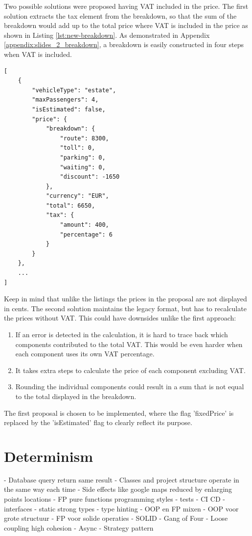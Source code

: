 Two possible solutions were proposed having VAT included in the price. The first solution extracts the tax element from the breakdown, so that the sum of the breakdown would add up to the total price where VAT is included in the price as shown in Listing \ref{lst:new-breakdown}. As demonstrated in Appendix \ref{appendix:slides_2_breakdown}, a breakdown is easily constructed in four steps when VAT is included.

\begin{lstlisting}[caption={Improved price breakdown}, label={lst:new-breakdown}]
[
	{
		"vehicleType": "estate",
		"maxPassengers": 4,
		"isEstimated": false,
		"price": {
			"breakdown": {
				"route": 8300,
				"toll": 0,
				"parking": 0,
				"waiting": 0,
				"discount": -1650
			},
			"currency": "EUR",
			"total": 6650,
			"tax": {
				"amount": 400,
				"percentage": 6
			}
		}
	},
	...
]
\end{lstlisting}

Keep in mind that unlike the listings the prices in the proposal are not displayed in cents. The second solution maintains the legacy format, but has to recalculate the prices without VAT. This could have downsides unlike the first approach:

\begin{enumerate}
	\item If an error is detected in the calculation, it is hard to trace back which components contributed to the total VAT. This would be even harder when each component uses its own VAT percentage.
	\item It takes extra steps to calculate the price of each component excluding VAT.
	\item Rounding the individual components could result in a sum that is not equal to the total displayed in the breakdown.
\end{enumerate}

The first proposal is chosen to be implemented, where the flag 'fixedPrice' is replaced by the 'isEstimated' flag to clearly reflect its purpose.

%
\section{Determinism}
- Database query return same result
- Classes and project structure operate in the same way each time
- Side effects like google maps reduced by enlarging points locations
- FP pure functions programming styles
- tests
- CI CD
- interfaces
- static strong types
- type hinting
- OOP en FP mixen
- OOP voor grote structuur
- FP voor solide operaties
- SOLID
- Gang of Four
- Loose coupling high cohesion
- Async
- Strategy pattern

